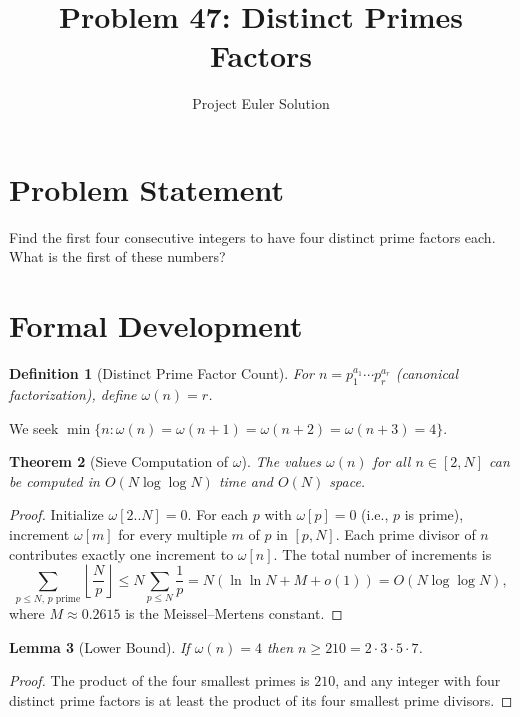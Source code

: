 \documentclass[12pt]{article}
\title{Problem 47: Distinct Primes Factors}
\author{Project Euler Solution}
\date{}
\newtheorem{theorem}{Theorem}
\newtheorem{lemma}[theorem]{Lemma}
\newtheorem{definition}[theorem]{Definition}
\begin{document}
\maketitle

\section{Problem Statement}

Find the first four consecutive integers to have four distinct prime factors each. What is the first of these numbers?

\section{Formal Development}

\begin{definition}[Distinct Prime Factor Count]
For $n = p_1^{a_1} \cdots p_r^{a_r}$ (canonical factorization), define $\omega(n) = r$.
\end{definition}

We seek $\min\{n : \omega(n) = \omega(n{+}1) = \omega(n{+}2) = \omega(n{+}3) = 4\}$.

\begin{theorem}[Sieve Computation of $\omega$]\label{thm:sieve}
The values $\omega(n)$ for all $n \in [2, N]$ can be computed in $O(N \log \log N)$ time and $O(N)$ space.
\end{theorem}

\begin{proof}
Initialize $\omega[2..N] = 0$. For each $p$ with $\omega[p] = 0$ (i.e., $p$ is prime), increment $\omega[m]$ for every multiple $m$ of $p$ in $[p, N]$. Each prime divisor of $n$ contributes exactly one increment to $\omega[n]$. The total number of increments is
\[
\sum_{p \leq N,\, p \text{ prime}} \left\lfloor \frac{N}{p} \right\rfloor
\leq N \sum_{p \leq N} \frac{1}{p}
= N(\ln\ln N + M + o(1))
= O(N \log \log N),
\]
where $M \approx 0.2615$ is the Meissel--Mertens constant.
\end{proof}

\begin{lemma}[Lower Bound]\label{lem:lower}
If $\omega(n) = 4$ then $n \geq 210 = 2 \cdot 3 \cdot 5 \cdot 7$.
\end{lemma}

\begin{proof}
The product of the four smallest primes is $210$, and any integer with four distinct prime factors is at least the product of its four smallest prime divisors.
\end{proof}
\end{document}

